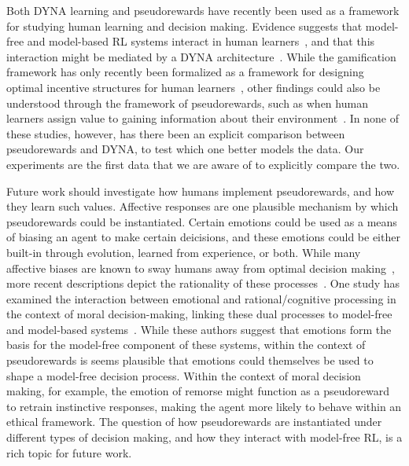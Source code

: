 \documentclass[notitlepage]{article}
\begin{document}
Both DYNA learning and pseudorewards have recently been used as a framework for studying human learning and decision making. Evidence suggests that model-free and model-based RL systems interact in human learners~\cite{otto2013working,otto2013curse}, and that this interaction might be mediated by a DYNA architecture~\cite{gershman2014retrospective}. While the gamification framework has only recently been formalized as a framework for designing optimal incentive structures for human learners~\cite{lieder2016helping}, other findings could also be understood through the framework of pseudorewards, such as when human learners assign value to gaining information about their environment~\cite{wilson2014humans}. In none of these studies, however, has there been an explicit comparison between pseudorewards and DYNA, to test which one better models the data. Our experiments are the first data that we are aware of to explicitly compare the two.

Future work should investigate how humans implement pseudorewards, and how they learn such values. Affective responses are one plausible mechanism by which pseudorewards could be instantiated. Certain emotions could be used as a means of biasing an agent to make certain deicisions, and these emotions could be either built-in through evolution, learned from experience, or both. While many affective biases are known to sway humans away from optimal decision making~\cite{kahneman1979prospect}, more recent descriptions depict the rationality of these processes~\cite{griffiths2008bayesian}. One study has examined the interaction between emotional and rational/cognitive processing in the context of moral decision-making, linking these dual processes to model-free and model-based systems~\cite{cushman2013action}. While these authors suggest that emotions form the basis for the model-free component of these systems, within the context of pseudorewards is seems plausible that emotions could themselves be used to shape a model-free decision process. Within the context of moral decision making, for example, the emotion of remorse might function as a pseudoreward to retrain instinctive responses, making the agent more likely to behave within an ethical framework. The question of how pseudorewards are instantiated under different types of decision making, and how they interact with model-free RL, is a rich topic for future work.
\end{document}
